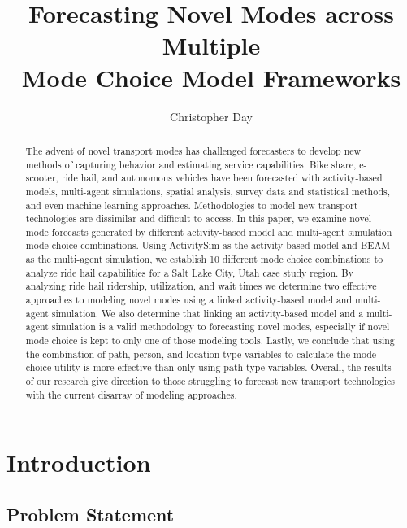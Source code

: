 \documentclass[12pt, oneside, openright]{byuthesis}
\title{Forecasting Novel Modes across Multiple\\
Mode Choice Model Frameworks}
\author{Christopher Day}
\begin{document}
\begin{abstract}
The advent of novel transport modes has challenged forecasters to develop new methods of capturing behavior and estimating service capabilities. Bike share, e-scooter, ride hail, and autonomous vehicles have been forecasted with activity-based models, multi-agent simulations, spatial analysis, survey data and statistical methods, and even machine learning approaches. Methodologies to model new transport technologies are dissimilar and difficult to access. In this paper, we examine novel mode forecasts generated by different activity-based model and multi-agent simulation mode choice combinations. Using ActivitySim as the activity-based model and BEAM as the multi-agent simulation, we establish 10 different mode choice combinations to analyze ride hail capabilities for a Salt Lake City, Utah case study region. By analyzing ride hail ridership, utilization, and wait times we determine two effective approaches to modeling novel modes using a linked activity-based model and multi-agent simulation. We also determine that linking an activity-based model and a multi-agent simulation is a valid methodology to forecasting novel modes, especially if novel mode choice is kept to only one of those modeling tools. Lastly, we conclude that using the combination of path, person, and location type variables to calculate the mode choice utility is more effective than only using path type variables. Overall, the results of our research give direction to those struggling to forecast new transport technologies with the current disarray of modeling approaches.
\end{abstract}


\makefrontmatter %
\thesisbody

\hypertarget{introduction}{%
\chapter{Introduction}\label{introduction}}

\hypertarget{problem-statement}{%
\section{Problem Statement}\label{problem-statement}}
\end{document}

